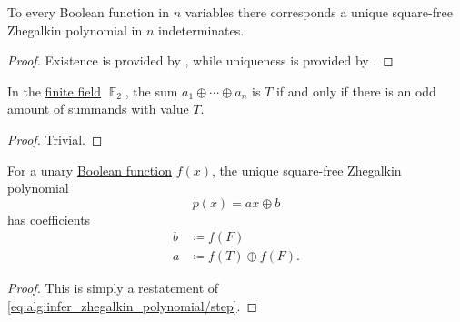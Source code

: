 \begin{proposition}\label{thm:zhegalkin_polynomial_uniqueness}
  To every Boolean function in \( n \) variables there corresponds a unique square-free Zhegalkin polynomial in \( n \) indeterminates.
\end{proposition}
\begin{proof}
  Existence is provided by , while uniqueness is provided by .
\end{proof}

\begin{lemma}\label{thm:f2_sum_parity}
  In the \hyperref[def:finite_field]{finite field} \( \BbbF_2 \), the sum \( a_1 \oplus \cdots \oplus a_n \) is \( T \) if and only if there is an odd amount of summands with value \( T \).
\end{lemma}
\begin{proof}
  Trivial.
\end{proof}

\begin{proposition}\label{thm:unary_boolean_function_zhegalkin_polynomial}
  For a unary \hyperref[def:boolean_function]{Boolean function} \( f(x) \), the unique square-free Zhegalkin polynomial
  \begin{equation}\label{eq:thm:unary_boolean_function_zhegalkin_polynomial}
    p(x) = ax \oplus b
  \end{equation}
  has coefficients
  \begin{align*}
    b &\coloneqq f(F) \\
    a &\coloneqq f(T) \oplus f(F).
  \end{align*}
\end{proposition}
\begin{proof}
  This is simply a restatement of \eqref{eq:alg:infer_zhegalkin_polynomial/step}.
\end{proof}

